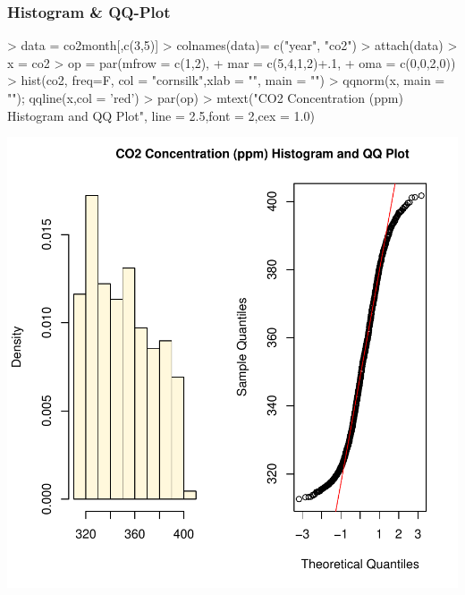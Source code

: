 \documentclass[11pt, a4paper]{article} %
\begin{document}
\subsubsection{Histogram \& QQ-Plot}
\begin{Schunk}
\begin{Sinput}
> data = co2month[,c(3,5)]
> colnames(data)= c("year", "co2")
> attach(data)
> x = co2
> op = par(mfrow = c(1,2),
+ mar = c(5,4,1,2)+.1,
+ oma = c(0,0,2,0))
> hist(co2, freq=F, col = "cornsilk",xlab = "", main = "")
> qqnorm(x, main = ""); qqline(x,col = 'red')
> par(op)
> mtext("CO2 Concentration (ppm) Histogram and QQ Plot", line = 2.5,font = 2,cex = 1.0)
\end{Sinput}
\end{Schunk}
\includegraphics{alles-fig1check}
\end{document}
